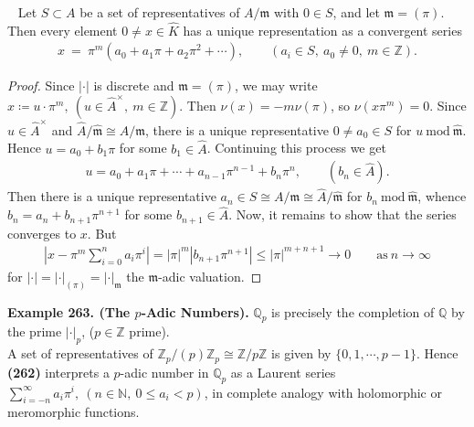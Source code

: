 \documentclass[12pt,a4paper,footinclude=true,headinclude=true]{scrbook} %
\newenvironment{proposition}[2][]
{\renewcommand\theinnercustomprop{#2}\innercustomprop[#1] 
\begin{mdframed}[backgroundcolor=gray!20]\ }
{\end{mdframed}\endinnercustomprop}
\newenvironment{example}[2][Example]
    { \begin{mdframed}[backgroundcolor=gray!20] \textbf{#1 #2.} }
    {  \end{mdframed}}
\begin{document}
\begin{proposition}{262}
    Let $S\subset A$ be a set of representatives of $A/\mathfrak{m}$ with $0\in S$, and let $\mathfrak{m}=(\pi)$. Then every element $0\neq x\in\widehat{K}$ has a unique representation as a convergent series
    \begin{align*}
        x\ =\ \pi^m(a_0+a_1\pi+a_2\pi^2+\cdots),\qquad (a_i\in S,\ a_0\neq0,\ m\in\mathbb{Z}).
    \end{align*}
\end{proposition}
\begin{proof}
    Since $|\cdot|$ is discrete and $\mathfrak{m}=(\pi)$, we may write $x\coloneqq u\cdot\pi^m,\ (u\in\widehat{A}^\times,\ m\in\mathbb{Z})$. Then $\nu(x)=-m\nu(\pi)$, so $\nu(x\pi^m)=0$. Since $u\in\widehat{A}^\times$ and $\widehat{A}/\widehat{\mathfrak{m}}\cong A/\mathfrak{m}$, there is a unique representative $0\neq a_0\in S$ for $u\ \mathrm{mod}\ \widehat{\mathfrak{m}}$. Hence $u=a_0+b_1\pi$ for some $b_1\in\widehat{A}$. Continuing this process we get
    \begin{align*}
        u=a_0+a_1\pi+\cdots+a_{n-1}\pi^{n-1}+b_n\pi^n,\qquad(b_n\in\widehat{A}).
    \end{align*}
    Then there is a unique representative $a_n\in S\cong A/\mathfrak{m}\cong\widehat{A}/\widehat{\mathfrak{m}}$ for $b_n\ \mathrm{mod}\ \widehat{\mathfrak{m}}$, whence $b_n=a_n+b_{n+1}\pi^{n+1}$ for some $b_{n+1}\in\widehat{A}$. Now, it remains to show that the series converges to $x$. But
    \begin{align*}
        |x-\pi^m\sum_{i=0}^na_i\pi^i|=|\pi|^m|b_{n+1}\pi^{n+1}|\leq|\pi|^{m+n+1}\longrightarrow0\qquad\text{as}\ n\to\infty
    \end{align*}
    for $|\cdot|=|\cdot|_{(\pi)}=|\cdot|_\mathfrak{m}$ the $\mathfrak{m}$-adic valuation. 
\end{proof}

\begin{example}{263. (The $p$-Adic Numbers)}
    \newline $\mathbb{Q}_p$ is precisely the completion of $\mathbb{Q}$ by the prime $|\cdot|_p$, ($p\in\mathbb{Z}$ prime).\\ A set of representatives of $\mathbb{Z}_p/(p)\mathbb{Z}_p\cong\mathbb{Z}/p\mathbb{Z}$ is given by $\{0,1,\cdots,p-1\}$. Hence \textbf{(262)} interprets a $p$-adic number in $\mathbb{Q}_p$ as a Laurent series $\sum_{i=-n}^\infty a_i\pi^i,\ (n\in\mathbb{N},\ 0\leq a_i<p)$, in complete analogy with holomorphic or meromorphic functions.
\end{example}
\end{document}
